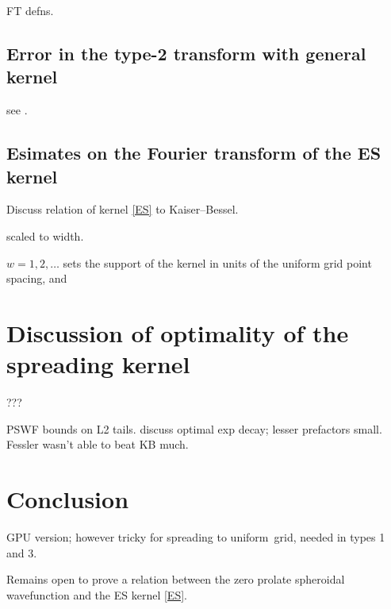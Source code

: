 \documentclass[10pt]{article}
\newcommand{\U}{{uniform}}
\newcommand{\KB}{Kaiser--Bessel}
\begin{document}
FT defns.

\subsection{Error in the type-2 transform with general kernel}

see \cite[Sec.~V.B]{fessler}.




\subsection{Esimates on the Fourier transform of the ES kernel}

Discuss relation of kernel \eqref{ES} to \KB.





scaled to width.

$w=1,2,\ldots$
sets the support of the kernel in units of the uniform grid point spacing, and



\section{Discussion of optimality of the spreading kernel}

???

PSWF bounds on L2 tails.
discuss optimal exp decay; lesser prefactors small.
Fessler wasn't able to beat KB much.



\section{Conclusion}



GPU version; however tricky for spreading to \U\ grid, needed in types 1 and 3.


Remains open to prove a relation between the zero prolate spheroidal
wavefunction and the ES kernel \eqref{ES}.






\end{document}
